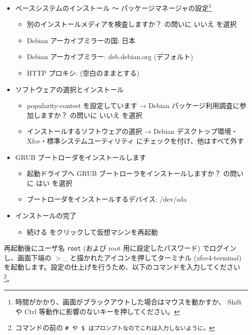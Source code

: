 \documentclass[a4j,oneside]{ujbook}
\begin{document}
\begin{itemize}
\begin{itemize}
  \item パーティショニング機構: すべてのファイルを 1 つのパーティションに (初心者ユーザには推奨)
  \item パーティショニングの終了とディスクへの変更の書き込み
  \item ディスクに変更を書き込みますか？ の問いに はい を選択
 \end{itemize}
 \item ベースシステムのインストール 〜 パッケージマネージャの設定\footnote{時間がかかり、画面がブラックアウトした場合はマウスを動かすか、 Shift や Ctrl 等動作に影響のないキーを押してください。}
 \begin{itemize}
  \item 別のインストールメディアを検査しますか？ の問いに いいえ を選択
  \item Debian アーカイブミラーの国: 日本
  \item Debian アーカイブミラー: deb.debian.org (デフォルト)
  \item HTTP プロキシ: (空白のままとする)
 \end{itemize}
 \item ソフトウェアの選択とインストール
 \begin {itemize}
   \item popularity-contest を設定しています → Debian パッケージ利用調査に参加しますか？ の問いに いいえ を選択
   \item インストールするソフトウェアの選択 → Debian デスクトップ環境・Xfce・標準システムユーティリティ にチェックを付け、他はすべて外す
 \end{itemize}
 \item GRUB ブートローダをインストールします
 \begin{itemize}
  \item 起動ドライブへ GRUB ブートローラをインストールしますか？ の問いに はい を選択
  \item ブートローダをインストールするデバイス: /dev/sda
 \end{itemize}
 \item インストールの完了
 \begin{itemize}
  \item 続ける をクリックして仮想マシンを再起動
 \end{itemize}     
\end{itemize}

再起動後にユーザ名 \verb+root+ (および root 用に設定したパスワード) でログインし、画面下端の $>$\_ と描かれたアイコンを押してターミナル (xfce4-terminal) を起動します。設定の仕上げを行うため、以下のコマンドを入力してください\footnote{コマンドの前の \tt{\#} や \tt{\$} はプロンプトなのでこれは入力しないように。}。
\end{document}
